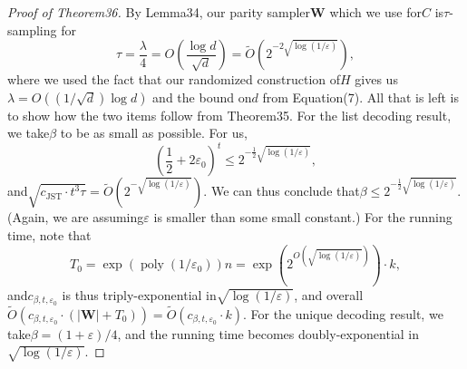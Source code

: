 \begin{proof}[Proof of Theorem36]
By Lemma34, our parity sampler$\mathbf W$ which we use for$C$ is$\tau$-sampling for
\[\tau=\frac\lambda4=O\left(\frac{\log d}{\sqrt d}\right)=\widetilde O(2^{-2\sqrt{\log(1/\varepsilon)}}),\]
where we used the fact that our randomized construction of$H$ gives us$\lambda=O((1/\sqrt d)\log d)$ and the bound on$d$ from Equation(7). All that is left is to show how the two items follow from Theorem35. For the list decoding result, we take$\beta$ to be as small as possible. For us,
\[\left(\frac12+2\varepsilon_0\right)^t\leq2^{-\frac12\sqrt{\log(1/\varepsilon)}},\]
and$\sqrt{c_{\mathrm{JST}}\cdot t^3\tau}=\widetilde O(2^{-\sqrt{\log(1/\varepsilon)}})$. We can thus conclude that$\beta\leq2^{-\frac12\sqrt{\log(1/\varepsilon)}}$. (Again, we are assuming$\varepsilon$ is smaller than some small constant.) For the running time, note that
\[T_0=\exp(\operatorname{poly}(1/\varepsilon_0))n=\exp\left(2^{O(\sqrt{\log(1/\varepsilon)})}\right)\cdot k,\]
and$c_{\beta,t,\varepsilon_0}$ is thus triply-exponential in$\sqrt{\log(1/\varepsilon)}$, and overall$\widetilde O(c_{\beta,t,\varepsilon_0}\cdot(|\mathbf W|+T_0))=\widetilde O(c_{\beta,t,\varepsilon_0}\cdot k)$. For the unique decoding result, we take$\beta=(1+\varepsilon)/4$, and the running time becomes doubly-exponential in$\sqrt{\log(1/\varepsilon)}$.
\end{proof}
